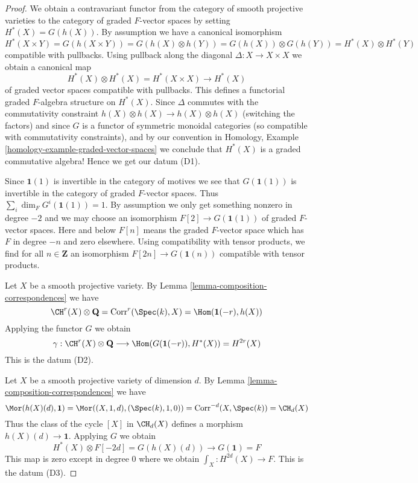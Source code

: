\begin{proof}
We obtain a contravariant functor from the category of smooth
projective varieties to the category of graded $F$-vector spaces
by setting $H^*(X) = G(h(X))$. By assumption we have a canonical
isomorphism
$$
H^*(X \times Y) = G(h(X \times Y)) = G(h(X) \otimes h(Y)) =
G(h(X)) \otimes G(h(Y)) = H^*(X) \otimes H^*(Y)
$$
compatible with pullbacks. Using pullback along the diagonal
$\Delta : X \to X \times X$ we obtain a canonical map
$$
H^*(X) \otimes H^*(X) = H^*(X \times X) \to H^*(X)
$$
of graded vector spaces compatible with pullbacks.
This defines a functorial graded $F$-algebra structure on
$H^*(X)$. Since $\Delta$ commutes with the commutativity
constraint $h(X) \otimes h(X) \to h(X) \otimes h(X)$ (switching the factors)
and since $G$ is a functor of symmetric monoidal categories (so compatible with
commutativity constraints), and by our convention in
Homology, Example \ref{homology-example-graded-vector-spaces}
we conclude that $H^*(X)$ is a graded
commutative algebra! Hence we get our datum (D1).

\medskip\noindent
Since $\mathbf{1}(1)$ is invertible in the category of motives
we see that $G(\mathbf{1}(1))$ is invertible in the category of
graded $F$-vector spaces. Thus $\sum_i \dim_F G^i(\mathbf{1}(1)) = 1$.
By assumption we only get something nonzero in degree $-2$ and we may
choose an isomorphism $F[2] \to G(\mathbf{1}(1))$ of graded $F$-vector spaces.
Here and below $F[n]$ means the graded $F$-vector space which has
$F$ in degree $-n$ and zero elsewhere. Using compatibility with
tensor products, we find for all $n \in \mathbf{Z}$ an isomorphism
$F[2n] \to G(\mathbf{1}(n))$ compatible with tensor products.

\medskip\noindent
Let $X$ be a smooth projective variety. By
Lemma \ref{lemma-composition-correspondences} we have
$$
\CH^r(X) \otimes \mathbf{Q} = \text{Corr}^r(\Spec(k), X) =
\Hom(\mathbf{1}(-r), h(X))
$$
Applying the functor $G$ we obtain
$$
\gamma :
\CH^r(X) \otimes \mathbf{Q} \longrightarrow
\Hom(G(\mathbf{1}(-r)), H^*(X)) = H^{2r}(X)
$$
This is the datum (D2).

\medskip\noindent
Let $X$ be a smooth projective variety of dimension $d$. By
Lemma \ref{lemma-composition-correspondences} we have
$$
\Mor(h(X)(d), \mathbf{1}) = \Mor((X, 1, d), (\Spec(k), 1, 0)) =
\text{Corr}^{-d}(X, \Spec(k)) = \CH_d(X)
$$
Thus the class of the cycle $[X]$ in $\CH_d(X)$ defines a morphism
$h(X)(d) \to \mathbf{1}$. Applying $G$ we obtain
$$
H^*(X) \otimes F[-2d] = G(h(X)(d)) \longrightarrow G(\mathbf{1}) = F
$$
This map is zero except in degree $0$ where we obtain
$\int_X : H^{2d}(X) \to F$. This is the datum (D3).


\end{proof}
